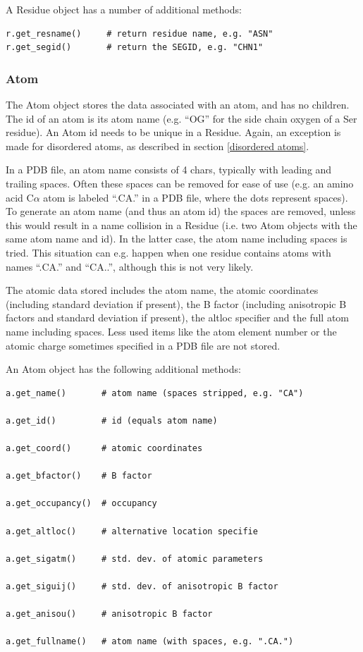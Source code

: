\documentclass{report}
\begin{document}
A Residue object has a number of additional methods:

\begin{verbatim}
r.get_resname()		# return residue name, e.g. "ASN"
r.get_segid()		# return the SEGID, e.g. "CHN1"
\end{verbatim}

\subsubsection{Atom}

The Atom object stores the data associated with an atom, and has no children.
The id of an atom is its atom name (e.g. {}``OG{}'' for the side chain oxygen
of a Ser residue). An Atom id needs to be unique in a Residue. Again, an exception
is made for disordered atoms, as described in section \ref{disordered atoms}.

In a PDB file, an atom name consists of 4 chars, typically with leading and
trailing spaces. Often these spaces can be removed for ease of use (e.g. an
amino acid C\( \alpha  \) atom is labeled {}``.CA.{}'' in a PDB file, where
the dots represent spaces). To generate an atom name (and thus an atom id) the
spaces are removed, unless this would result in a name collision in a Residue
(i.e. two Atom objects with the same atom name and id). In the latter case,
the atom name including spaces is tried. This situation can e.g. happen when
one residue contains atoms with names {}``.CA.{}'' and {}``CA..{}'', although
this is not very likely. 

The atomic data stored includes the atom name, the atomic coordinates (including
standard deviation if present), the B factor (including anisotropic B factors
and standard deviation if present), the altloc specifier and the full atom name
including spaces. Less used items like the atom element number or the atomic
charge sometimes specified in a PDB file are not stored. 

An Atom object has the following additional methods: 

\begin{verbatim}
a.get_name()       # atom name (spaces stripped, e.g. "CA")

a.get_id()         # id (equals atom name)

a.get_coord()      # atomic coordinates

a.get_bfactor()    # B factor

a.get_occupancy()  # occupancy

a.get_altloc()     # alternative location specifie

a.get_sigatm()     # std. dev. of atomic parameters

a.get_siguij()     # std. dev. of anisotropic B factor

a.get_anisou()     # anisotropic B factor

a.get_fullname()   # atom name (with spaces, e.g. ".CA.")
\end{verbatim}
\end{document}
